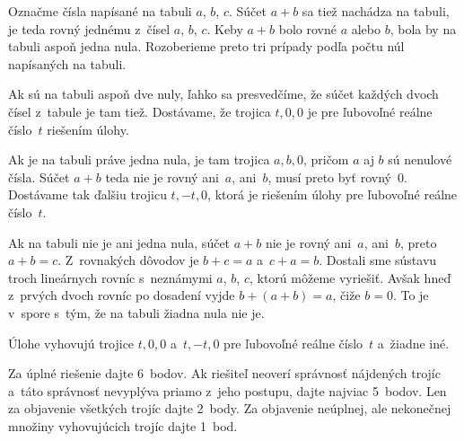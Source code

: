 {%
Označme čísla napísané na tabuli $a$, $b$, $c$. Súčet $a+b$ sa tiež nachádza na
tabuli, je teda rovný jednému z~čísel $a$, $b$, $c$. Keby $a+b$ bolo
rovné $a$ alebo $b$, bola by na tabuli aspoň jedna nula. Rozoberieme preto tri
prípady podľa počtu núl napísaných na tabuli.

Ak sú na tabuli aspoň dve nuly, ľahko sa presvedčíme, že
súčet každých dvoch čísel z~tabule je tam tiež.
Dostávame, že trojica $t,0,0$ je pre ľubovoľné reálne číslo~$t$ riešením úlohy.

Ak je na tabuli práve jedna nula, je tam trojica $a,b,0$, pričom $a$
aj $b$ sú nenulové čísla.
Súčet $a+b$ teda nie je rovný ani~$a$, ani~$b$, musí preto byť rovný~$0$.
Dostávame tak ďalšiu trojicu
$t,-t,0$, ktorá je riešením úlohy pre ľubovoľné reálne číslo~$t$.

Ak na tabuli nie je ani jedna nula, súčet $a+b$ nie je rovný ani~$a$,
ani~$b$, preto $a+b = c$. Z~rovnakých dôvodov je $b+c = a$ a~$c+a = b$. Dostali sme
sústavu troch lineárnych rovníc s~neznámymi $a$, $b$, $c$, ktorú môžeme vyriešiť.
Avšak hneď z~prvých dvoch rovníc po dosadení vyjde $b+(a+b)=a$, čiže $b=0$.
To je v~spore s~tým, že na tabuli žiadna nula nie je.

\zaver
Úlohe vyhovujú trojice $t,0,0$ a~$t,-t,0$ pre ľubovoľné reálne
číslo~$t$ a~žiadne iné.

\nobreak\medskip\petit\noindent
Za úplné riešenie dajte 6~bodov.
Ak riešiteľ neoverí správnosť
nájdených trojíc a~táto správnosť nevyplýva priamo z~jeho postupu, dajte najviac
5~bodov.
Len za objavenie všetkých trojíc dajte 2~body. Za objavenie neúplnej,
ale nekonečnej množiny vyhovujúcich trojíc dajte 1~bod.
\endpetit
\bigbreak
}

